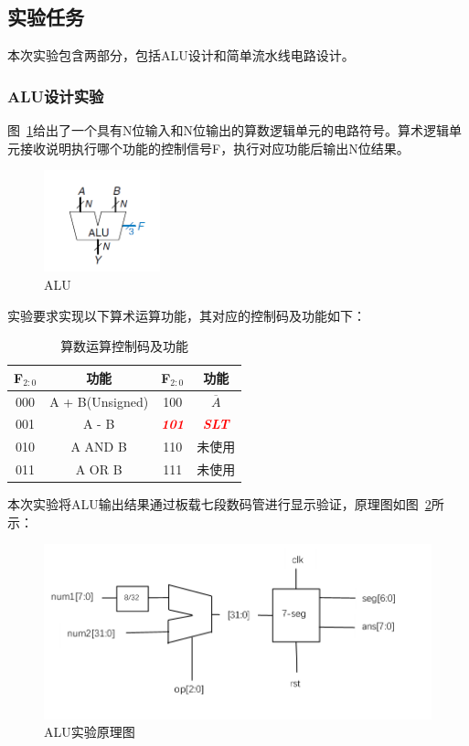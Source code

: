 \subsection{实验任务}
本次实验包含两部分，包括ALU设计和简单流水线电路设计。
\subsubsection{ALU设计实验}
图~\ref{fig:alu}给出了一个具有N位输入和N位输出的算数逻辑单元的电路符号。算术逻辑单元接收说明执行哪个功能的控制信号F，执行对应功能后输出N位结果。
\newpage

\begin{figure}[htbp]
    \centering
    \includegraphics[width = 0.3\textwidth]{image/1_section/alu.png}
    \caption{ALU}
    \label{fig:alu}
\end{figure}

实验要求实现以下算术运算功能，其对应的控制码及功能如下：
\begin{table}[htbp]
    \centering
    \begin{tabular}{cccc}
        \hline
         F$_{2:0}$ & 功能 & F$_{2:0}$ & 功能  \\
         \hline
         000 & A + B(Unsigned) & 100 & $\overline{A}$ \\
         001 & A - B & \textcolor{red}{\textit{\textbf{101}}} & \textcolor{red}{\textit{\textbf{SLT}}}\\
         010 & A AND B & 110 & 未使用\\
         011 & A OR B  & 111 & 未使用\\
         \hline
    \end{tabular}
    \caption{算数运算控制码及功能}
    \label{tab:opcode}
\end{table}

本次实验将ALU输出结果通过板载七段数码管进行显示验证，原理图如图~\ref{fig:alu_experiment}所示：

\begin{figure}[htbp]
    \centering
    \includegraphics{image/1_section/alu_experiment.png}
    \caption{ALU实验原理图}
    \label{fig:alu_experiment}
\end{figure}

